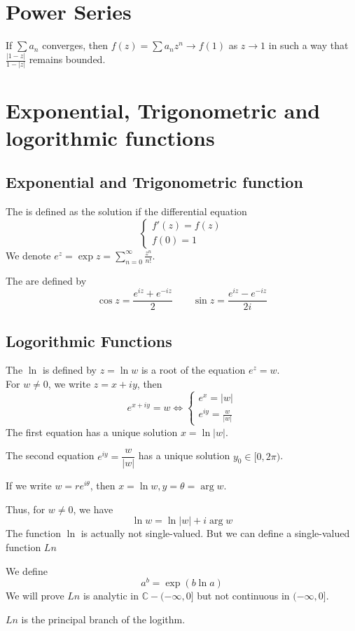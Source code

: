 \section{Power Series}
\begin{theorem}
If  $ \sum a_n  $ converges, then  $ f(z)=\sum a_nz^n\rightarrow f(1)  $ as  $ z\rightarrow 1  $ in such a way that  $ \frac{|1-z| }{1-|z| } $ remains bounded.
\end{theorem}
\section{Exponential, Trigonometric and logorithmic functions}
\subsection{Exponential and Trigonometric function}
The  is defined as the solution if the differential equation
\[\left\{
    \begin{aligned}
        f'(z)=f(z)\\
        f(0)=1
    \end{aligned}
\right.\]
We denote  $ e^z=\exp z=\sum\limits_{n=0}^\infty \frac{z^n}{n!} $.

The  are defined by 
\[\cos z=\frac{e^{iz}+e^{-iz}}{2}\qquad \sin z=\frac{e^{iz}-e^{-iz}}{2i}\]
\subsection{Logorithmic Functions}
The   $ \ln  $ is defined by  $ z=\ln w  $ is a root of the equation  $ e^z=w $.\\
For  $ w\not=0 $, we write  $ z=x+iy $, then 
\[e^{x+iy}=w\Leftrightarrow 
\left\{
    \begin{aligned}
        e^x=|w|\\
        e^{iy}=\frac{w }{|w|}
    \end{aligned}
\right.\]   
The first equation has a unique solution  $ x=\ln|w|  $.

The second equation  $ e^{iy}=\dfrac{w }{|w|}  $ has a unique solution  $ y_0\in [0,2\pi) $.

If we write  $ w=re^{i\theta} $, then  $ x=\ln w,y=\theta =\arg w $.

Thus, for  $ w\not=0  $, we have 
\[\ln w=\ln|w|+i\arg w\]
The function  $ \ln  $ is actually not single-valued. But we can define a single-valued function  $ Ln $ 

We define 
\[a^b=\exp(b\ln a)\]   
We will prove  $ Ln  $ is analytic in  $ \mathbb{C}-(-\infty,0] $ but not continuous in  $ (-\infty,0] $.

 $ Ln  $ is the principal branch of the logithm.   